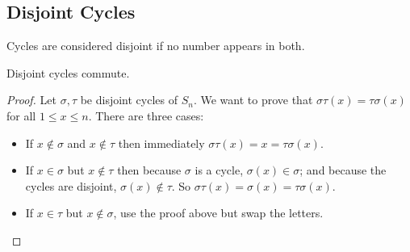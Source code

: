 \subsection{Disjoint Cycles}
Cycles are considered disjoint if no number appears in both.
\begin{lemma}
	Disjoint cycles commute.
\end{lemma}
\begin{proof}
	Let \(\sigma, \tau\) be disjoint cycles of \(S_n\). We want to prove that \(\sigma\tau(x) = \tau\sigma(x)\) for all \(1 \leq x \leq n\). There are three cases:
	\begin{itemize}
		\item If \(x \notin \sigma\) and \(x \notin \tau\) then immediately \(\sigma\tau(x) = x = \tau\sigma(x)\).
		\item If \(x \in \sigma\) but \(x \notin \tau\) then because \(\sigma\) is a cycle, \(\sigma(x) \in \sigma\); and because the cycles are disjoint, \(\sigma(x) \notin \tau\). So \(\sigma\tau(x) = \sigma(x) = \tau\sigma(x)\).
		\item If \(x \in \tau\) but \(x \notin \sigma\), use the proof above but swap the letters.
	\end{itemize}
\end{proof}

